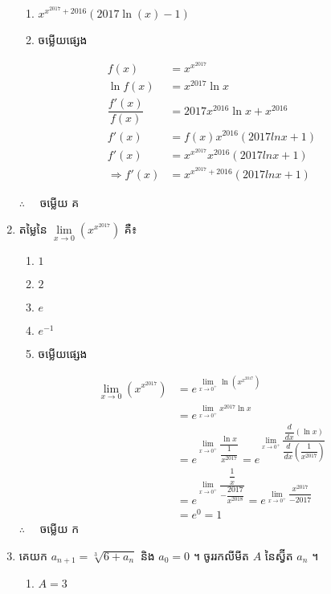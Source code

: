 \documentclass[12pt, a4paper]{article}
\begin{document}
\begin{enumerate}[m]
\begin{enumerate}[k,2]
		\item $x^{x^{2017}+2016}\left(2017\ln\left(x\right)-1\right)$
		\item ចម្លើយផ្សេង
	\end{enumerate}
	\answer
	\begin{align*}
	f(x)&=x^{x^{2017}}\\
	\ln f(x)&=x^{2017}\ln x\\
	\dfrac{f'(x)}{f(x)}&=2017x^{2016}\ln x +x^{2016}\\
	f'(x)&=f(x)x^{2016}\left(2017ln x+1\right)\\
	f'(x)&=x^{x^{2017}}x^{2016}\left(2017ln x+1\right)\\
	\Rightarrow f'(x)&=x^{x^{2017}+2016}\left(2017ln x+1\right)
	\end{align*}
	\begin{center}
		$\therefore \quad$ \kml ចម្លើយ \kbk គ
	\end{center}
	{\color{blue}\hrulefill}
	\item តម្លៃនៃ $\lim\limits_{x\to0}\left(x^{x^{2017}}\right)$ គឺ៖
	\begin{enumerate}[k,5]
		\item $1$
		\item $2$
		\item $e$
		\item $e^{-1}$
		\item ចម្លើយផ្សេង
	\end{enumerate}
	\answer
	\begin{center}
		\begin{align*}
		\lim\limits_{x\to0}\left(x^{x^{2017}}\right)&=e^{\lim\limits_{x\to0^+}\ln\left(x^{x^{2017}}\right)}\\
		&=e^{\lim\limits_{x\to0^+}x^{2017}\ln x}\\
		&=e^{\lim\limits_{x\to0^+}\dfrac{\ln x}{\dfrac{1}{x^{2017}}}}=e^{\lim\limits_{x\to0^+}\dfrac{\dfrac{d}{dx}\left(\ln x\right)}{\dfrac{d}{dx}\left(\dfrac{1}{x^{2017}}\right)}}\\
		&=e^{\lim\limits_{x\to0^+}\dfrac{\dfrac{1}{x}}{-\dfrac{2017}{x^{2018}}}}=e^{\lim\limits_{x\to0^+}\dfrac{x^{2017}}{-2017}}\\
		&=e^0=1
		\end{align*}
		$\therefore \quad$ \kml ចម្លើយ \kbk ក
	\end{center}
	{\color{blue}\hrulefill}
	\item គេយក $a_{n+1}=\sqrt[3]{6+a_n}$ និង $a_0=0$ ។ ចូររកលីមីត $A$ នៃស្វ៊ីត $a_n$ ។
	\begin{enumerate}[k,5]
		\item $A=3$

\end{enumerate}
\end{enumerate}
\end{document}
